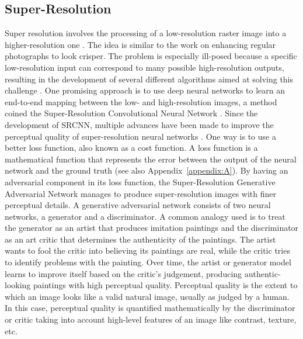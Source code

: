 \subsection{Super-Resolution} \label{section:superresolution}

Super resolution involves the processing of a low-resolution raster image into a higher-resolution one \citep{TsaiMultiframeimagerestoration1984}.
The idea is similar to the work on enhancing regular photographs to look crisper.
The problem is especially ill-posed because a specific low-resolution input can correspond to many possible high-resolution outputs, resulting in the development of several different algorithms aimed at solving this challenge \citep[see][for a review]{NasrollahiSuperresolutioncomprehensivesurvey2014}.
One promising approach is to use deep neural networks \citep{LeCunDeeplearning2015} to learn an end-to-end mapping between the low- and high-resolution images, a method coined the Super-Resolution Convolutional Neural Network \citep[SRCNN;][]{DongImageSuperResolutionUsing2014}.
Since the development of SRCNN, multiple advances have been made to improve the perceptual quality of super-resolution neural networks \citep[see][for a review]{YangDeepLearningSingle2019}.
One way is to use a better loss function, also known as a cost function.
A loss function is a mathematical function that represents the error between the output of the neural network and the ground truth (see also Appendix~\ref{appendix:A}).
By having an adversarial component in its loss function, the Super-Resolution Generative Adversarial Network \citep[SRGAN;][]{LedigPhotoRealisticSingleImage2017} manages to produce super-resolution images with finer perceptual details.
A generative adversarial network \citep{GoodfellowGenerativeAdversarialNetworks2014} consists of two neural networks, a generator and a discriminator.
A common analogy used is to treat the generator as an artist that produces imitation paintings and the discriminator as an art critic that determines the authenticity of the paintings.
The artist wants to fool the critic into believing its paintings are real, while the critic tries to identify problems with the painting.
Over time, the artist or generator model learns to improve itself based on the critic's judgement, producing authentic-looking paintings with high perceptual quality.
Perceptual quality is the extent to which an image looks like a valid natural image, usually as judged by a human.
In this case, perceptual quality is quantified mathematically by the discriminator or critic taking into account high-level features of an image like contrast, texture, etc.
